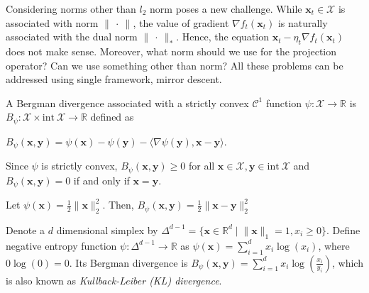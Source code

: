 \documentclass[12pt, a4paper]{report}
\begin{document}
Considering norms other than $l_2$ norm poses a new challenge. While $\mathbf{x}_t \in \mathcal{X}$ is associated with norm $\lVert\ \cdot\ \rVert$, the value of gradient $\nabla f_t(\mathbf{x}_t)$ is naturally associated with the dual norm $\lVert\ \cdot\ \rVert_{*}$. Hence, the equation $\mathbf{x}_t - \eta_t \nabla f_t(\mathbf{x}_t)$ does not make sense. Moreover, what norm should we use for the projection operator? Can we use something other than norm?
All these problems can be addressed using single framework, mirror descent. 


\begin{defn}
A Bergman divergence associated with a strictly convex $\mathcal{C}^1$ function $\psi : \mathcal{X} \rightarrow \mathbb{R}$ is $B_\psi : \mathcal{X} \times \mathrm{int}\ \mathcal{X} \rightarrow \mathbb{R}$ defined as
\begin{center}
    $B_\psi(\mathbf{x}, \mathbf{y}) = \psi(\mathbf{x}) - \psi(\mathbf{y}) - \langle \nabla \psi(\mathbf{y}), \mathbf{x} - \mathbf{y} \rangle$.
\end{center}
\end{defn}

Since $\psi$ is strictly convex, $B_\psi(\mathbf{x}, \mathbf{y}) \geq 0$ for all $\mathbf{x} \in \mathcal{X}, \mathbf{y} \in \mathrm{int}\ \mathcal{X}$ and $B_\psi(\mathbf{x}, \mathbf{y}) = 0$ if and only if $\mathbf{x} = \mathbf{y}$.

\begin{exmp}
Let $\psi(\mathbf{x}) = \frac{1}{2}\lVert \mathbf{x} \rVert_{2}^2$. Then, $B_\psi(\mathbf{x}, \mathbf{y}) = \frac{1}{2} \lVert \mathbf{x} - \mathbf{y} \rVert_2^2$
\end{exmp}

\begin{exmp}
Denote a $d$ dimensional simplex by $\Delta^{d-1} = \{\mathbf{x} \in \mathbb{R}^d \mid \lVert \mathbf{x} \rVert_1 = 1, x_i \geq 0 \}$. 
Define negative entropy function $\psi : \Delta^{d-1} \rightarrow \mathbb{R}$ as $\psi(\mathbf{x}) = \sum_{i=1}^d x_i \log(x_i)$, where $0 \log(0) = 0$. 
Its Bergman divergence is $B_\psi(\mathbf{x}, \mathbf{y}) = \sum_{i=1}^d x_i \log(\frac{x_i}{y_i})$, which is also known as \textit{Kullback-Leiber (KL) divergence}.
\end{exmp}
\end{document}
